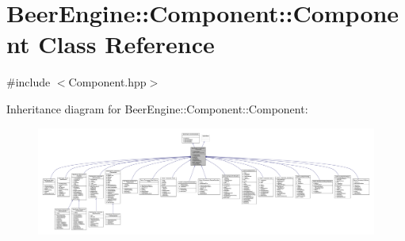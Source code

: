 \hypertarget{class_beer_engine_1_1_component_1_1_component}{}\section{Beer\+Engine\+:\+:Component\+:\+:Component Class Reference}
\label{class_beer_engine_1_1_component_1_1_component}


{\ttfamily \#include $<$Component.\+hpp$>$}



Inheritance diagram for Beer\+Engine\+:\+:Component\+:\+:Component\+:\nopagebreak
\begin{figure}[H]
\begin{center}
\leavevmode
\includegraphics[width=350pt]{class_beer_engine_1_1_component_1_1_component__inherit__graph}
\end{center}
\end{figure}


